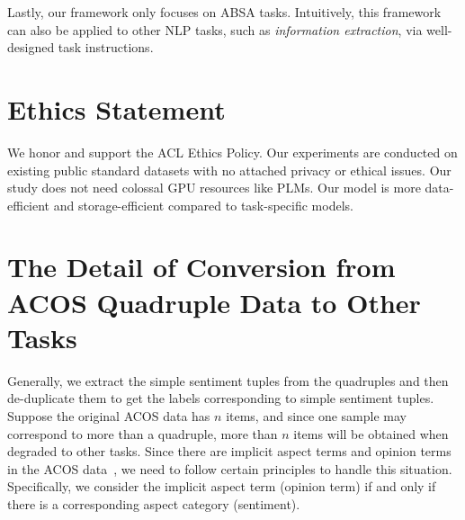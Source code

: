 \documentclass[11pt]{article}
\begin{document}
Lastly, our framework only focuses on ABSA tasks. Intuitively, this framework can also be applied to other NLP tasks, such as \emph{information extraction}, via well-designed task instructions.




\section*{Ethics Statement}

We honor and support the ACL Ethics Policy. Our experiments are conducted on existing public standard datasets with no attached privacy or ethical issues. Our study does not need colossal GPU resources like PLMs. Our model is more data-efficient and storage-efficient compared to task-specific models. 











\appendix








\section{The Detail of Conversion from ACOS Quadruple Data to Other Tasks}
\label{sec-appendix:acos-data-conversion}

Generally, we extract the simple sentiment tuples from the quadruples and then de-duplicate them to get the labels corresponding to simple sentiment tuples. Suppose the original ACOS data has $n$ items, and since one sample may correspond to more than a quadruple, more than $n$ items will be obtained when degraded to other tasks. Since there are implicit aspect terms and opinion terms in the ACOS data~\citep{cai-etal-2021-acos}, we need to follow certain principles to handle this situation. Specifically, we consider the implicit aspect term (opinion term) if and only if there is a corresponding aspect category (sentiment).
\end{document}
